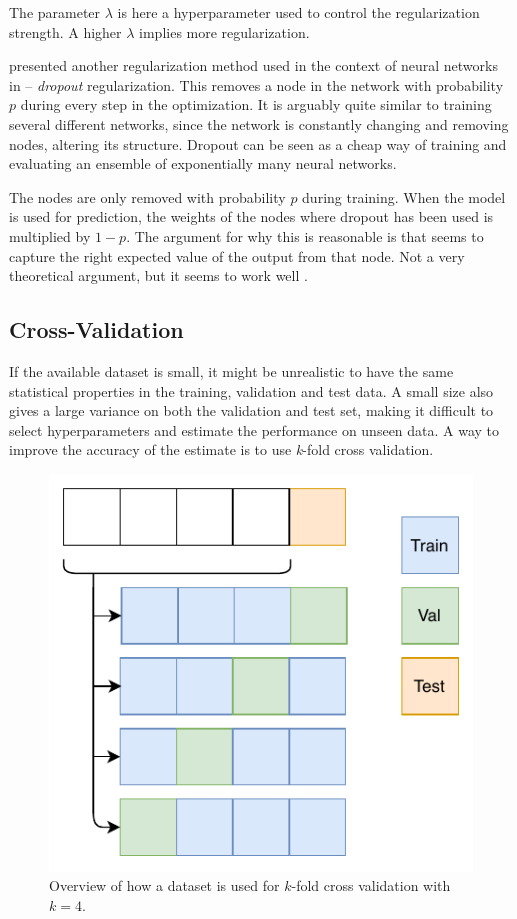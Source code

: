 The parameter $\lambda$ is here a hyperparameter used to control the regularization strength. A higher $\lambda$ implies more regularization. 

\citeauthor{hinton2012improving} presented another regularization method used in the context of neural networks in \citeyear{hinton2012improving} --  \emph{dropout} regularization. This removes a node in the network with probability $p$ during every step in the optimization. It is arguably quite similar to training several different networks, since the network is constantly changing and removing nodes, altering its structure. Dropout can be seen as a cheap way of training and evaluating an ensemble of exponentially many neural networks. 

The nodes are only removed with probability $p$ during training. When the model is used for prediction, the weights of the nodes where dropout has been used is multiplied by $1 - p$. The argument for why this is reasonable is that seems to capture the right expected value of the output from that node. Not a very theoretical argument, but it seems to work well \citep{hinton2012improving}. 


\subsection{Cross-Validation}\label{sec:crossval}

If the available dataset is small, it might be unrealistic to have the same statistical properties in the training, validation and test data. A small size also gives a large variance on both the validation and test set, making it difficult to select hyperparameters and estimate the performance on unseen data. A way to improve the accuracy of the estimate is to use \emph{k}-fold cross validation.  

\begin{figure}[H]
    \centering
    \includegraphics{Figures/figs-k-fold.pdf}
    \caption{Overview of how a dataset is used for $k$-fold cross validation with $k=4$. }
    \label{fig:kfold}
\end{figure}

